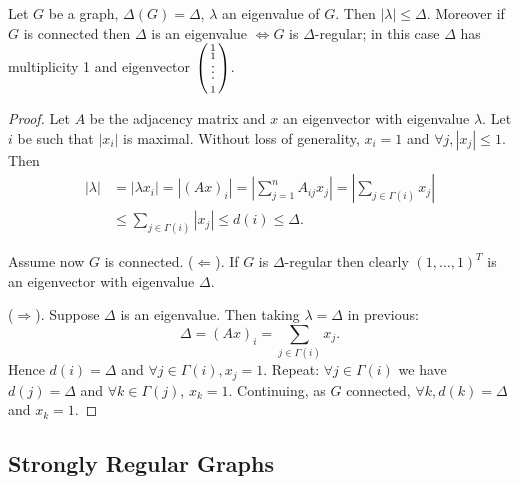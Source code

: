 \documentclass{article}
\begin{document}
\begin{nthm}\label{thm:46}
    Let $G$ be a graph, $\Delta(G) = \Delta$, $\lambda$ an eigenvalue of $G$.
    Then $|\lambda| \leq \Delta$.
    Moreover if $G$ is connected then $\Delta$ is an eigenvalue $\iff G$ is $\Delta$-regular; in this case $\Delta$ has multiplicity 1 and eigenvector $\left(\begin{smallmatrix}1\\1\\  \vphantom{\int\limits^x}\smash{\vdots}\\1\end{smallmatrix}\right)$.
\end{nthm}
\begin{proof}
    Let $A$ be the adjacency matrix and $x$ an eigenvector with eigenvalue $\lambda$.
    Let $i$ be such that $|x_i|$ is maximal. Without loss of generality, $x_i = 1$ and $\forall j, |x_j| \leq 1$.
    Then
    \begin{align*}
        |\lambda| &= |\lambda x_i| = |(A x)_i| = \left|\sum_{j=1}^n A_{ij} x_j\right| = \left|\sum_{j \in \Gamma(i)} x_j\right| \\
                  &\leq \sum_{j \in \Gamma(i)} |x_j| \leq d(i) \leq \Delta.
    \end{align*}

    Assume now $G$ is connected.
    ($\Leftarrow$). If $G$ is $\Delta$-regular then clearly $(1,\dotsc,1)^T$ is an eigenvector with eigenvalue $\Delta$.

    ($\Rightarrow$). Suppose $\Delta$ is an eigenvalue. Then taking $\lambda = \Delta$ in previous:
    \begin{equation*}
        \Delta = (Ax)_i = \sum_{j \in \Gamma(i)} x_j.
    \end{equation*}
    Hence $d(i) = \Delta$ and $\forall j \in \Gamma(i), x_j=1$.
    Repeat: $\forall j \in \Gamma(i)$ we have $d(j) = \Delta$ and $\forall k \in \Gamma(j)$, $x_k = 1$.
    Continuing, as $G$ connected, $\forall k, d(k) = \Delta$ and $x_k = 1$.
\end{proof}
\subsection{Strongly Regular Graphs}
\end{document}
